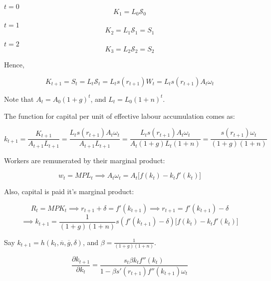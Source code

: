 $t=0$
\begin{equation*}
    K_{1}=L_{0} \mathcal{S}_0
\end{equation*}

$t=1$
\begin{equation*}
    K_{2}=L_{1} \mathcal{S}_{1}=S_{1}
\end{equation*}

$t=2$
\begin{equation*}
    K_{3}=L_{2} \mathcal{S}_{2}=S_{2}
\end{equation*}

Hence, 

\begin{equation*}
    K_{t+1}=S_{t}=L_{t}\mathcal{S}_{t}=L_{t}s(r_{t+1})W_{t}=L_{t}s(r_{t+1})A_{t}\omega_{t}
\end{equation*}

Note that $A_{t}=A_{0}(1+g)^t$, and $L_{t}=L_{0}(1+n)^t$.

The function for capital per unit of effective labour accumulation comes as:

\begin{equation*}
    k_{t+1}=\frac{K_{t+1}}{A_{t+1}L_{t+1}}=\frac{L_{t}s(r_{t+1})A_{t}\omega_{t}}{A_{t+1}L_{t+1}}=\frac{L_{t}s(r_{t+1})A_{t}\omega_{t}}{A_{t}(1+g)L_{t}(1+n)}=\frac{s(r_{t+1})\omega_{t}}{(1+g)(1+n)}
\end{equation*}

Workers are remunerated by their marginal product: 

\begin{equation*}
    w_{t}=MPL_{t} \implies A_{t}\omega_{t}=A_{t}\big[f(k_{t})-k_{t}f'(k_{t}) \big]
\end{equation*}

Also, capital is paid it's marginal product: 

\begin{equation*}
    R_{t}=MPK_{t} \implies r_{t+1}+\delta=f'(k_{t+1}) \implies r_{t+1}=f'(k_{t+1})-\delta
\end{equation*}
\begin{equation*}
   \implies k_{t+1}=\frac{1}{(1+g)(1+n)}s(f'(k_{t+1})-\delta)\big[f(k_{t})-k_{t}f'(k_{t}) \big]
\end{equation*}

Say $k_{t+1}=h(k_{t},\overline{n},\overline{g},\delta)$, and $\beta=\frac{1}{(1+g)(1+n)}$.

\begin{equation*}
    \frac{\partial k_{t+1}}{\partial k_{t}}=\frac{s_{t}\beta k_{t}f''(k_{t})}{1-\beta s'(r_{t+1})f''(k_{t+1})\omega_{t}}
\end{equation*}

